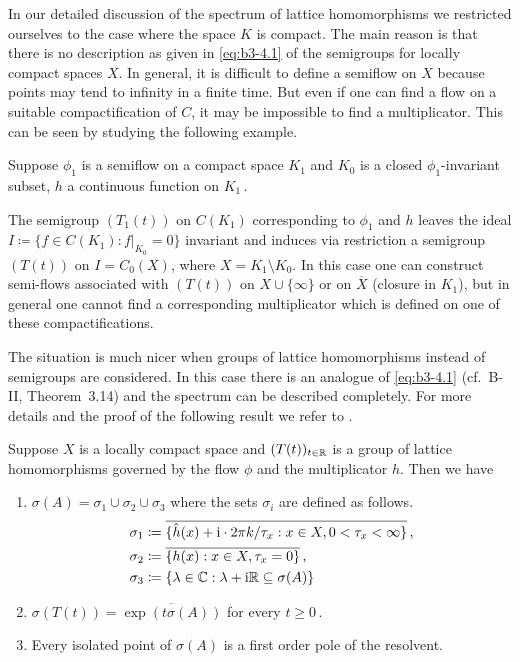 	In our detailed discussion of the spectrum of lattice homomorphisms we restricted ourselves to the case where the space $K$ is compact.
	The main reason is that there is no description as given in \eqref{eq:b3-4.1} of the semigroups for locally compact spaces $X$.
	In general, it is difficult to define a semiflow on $X$ because points may tend to infinity in a finite time.
	But even if one can find a flow on a suitable compactification of $C$, it may be impossible to find a multiplicator.
	This can be seen by studying the following example.
	
	Suppose $\phi_{1}$ is a semiflow on a compact space $K_{1}$ and $K_{0}$ is a closed $\phi_{1}$-invariant subset, $h$ a continuous function on $K_{1}$\,.

    The semigroup $(T_{1}(t))$ on $C(K_{1})$ corresponding to $\phi_{1}$ and $h$ leaves the ideal $I \coloneq \{f \in C(K_{1}) : f|_{K_{0}} = 0\}$ invariant and induces via restriction a semigroup $(T(t))$ on $I = C_{0}(X)$, where $X = K_{1} \setminus K_{0}$.
    In this case one can construct semi-flows associated with $(T(t))$ on $X\cup\{\infty\}$ or on $\overline{X}$ (closure in $K_{1}$), but in general one cannot find a corresponding multiplicator which is defined on one of these compactifications.

The situation is much nicer when groups of lattice homomorphisms instead of semigroups are considered.
In this case there is an analogue of \eqref{eq:b3-4.1} (cf.\ B-II, Theorem~3.14) and the spectrum can be described completely.
For more details and the proof of the following result we refer to \citet{arendtgreiner:1984}.
\begin{theorem}\label{thm:b3-4.11}
	Suppose $X$ is a locally compact space and $(T(t))_{t\in\mathbb{R}}$ is a group of lattice homomorphisms governed by the flow $\phi$ and the multiplicator $h$.
	Then we have
	\begin{enumerate}[\upshape (i)]
		\item 
		$\sigma(A) = \sigma_{1}\cup\sigma_{2}\cup\sigma_{3}$ where the sets $\sigma_{i}$ are defined as follows.
		\[\begin{aligned}
			\sigma_{1} &\coloneq \overline{\{\hat{h}(x) + \mathrm{i}\cdot 2\pi k/\tau_{x} : x \in X, 0 < \tau_{x} < \infty\}}\,,\\
			\sigma_{2} &\coloneq \overline{\{h(x) : x \in X, \tau_{x} = 0\}}\,, \\
			\sigma_{3} &\coloneq \{\lambda \in \mathbb{C} : \lambda + \mathrm{i}\mathbb{R} \subseteq \sigma(A)\}
		\end{aligned}\]
		
		\item 
		$\sigma(T(t)) = \overline{\exp(t\sigma(A))}$ for every $t \geq 0$\,.
		
		\item 
		Every isolated point of $\sigma(A)$ is a first order pole of the resolvent.
	\end{enumerate}
\end{theorem}

